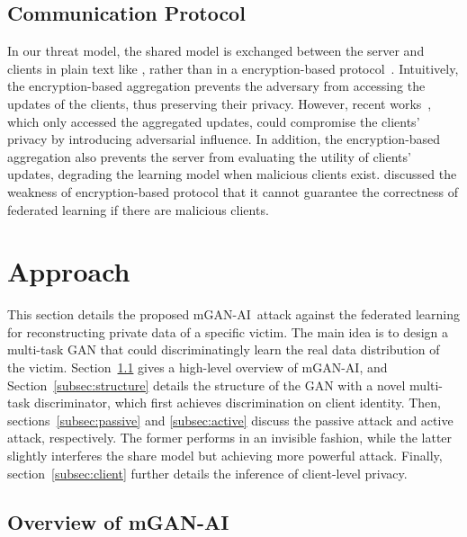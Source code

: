 \documentclass[10pt, conference, letterpaper]{IEEEtran}
\newcommand{\alg}{mGAN-AI}
\begin{document}
\subsection{Communication Protocol}
In our threat model, the shared model is exchanged between the server and clients in plain text like \cite{mcmahan2016communication}, rather than in a encryption-based protocol~\cite{corrigan2013proactively,bonawitz2017practical}. Intuitively, the encryption-based aggregation prevents the adversary from accessing the updates of the clients, thus preserving their privacy.
However, recent works~\cite{hitaj2017deep,melis2018inference}, which only accessed the aggregated updates, could compromise the clients' privacy by introducing adversarial influence. In addition,
the encryption-based aggregation also prevents the server from evaluating the utility of clients' updates, degrading the learning model when malicious clients exist.
\cite{bonawitz2017practical} discussed the weakness of encryption-based protocol that it cannot guarantee the correctness of federated learning if there are malicious clients.



\section{Approach}
\label{sec:attack}

This section details the proposed \alg~attack against the federated learning for reconstructing private data of a specific victim. The main idea is to design a multi-task GAN that could discriminatingly learn the real data distribution of the victim.
Section~\ref{subsec:overview} gives a high-level overview of \alg, and Section~\ref{subsec:structure} details the structure of the GAN with a novel multi-task discriminator, which first achieves discrimination on client identity.
Then, sections~\ref{subsec:passive} and \ref{subsec:active} discuss the passive attack and active attack, respectively. The former performs in an invisible fashion, while the latter slightly interferes the share model but achieving more powerful attack. Finally, section~\ref{subsec:client} further details the inference of client-level privacy.

\subsection{Overview of \alg}
\label{subsec:overview}
\end{document}
